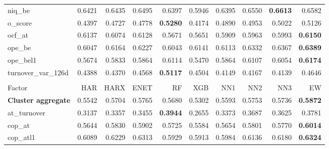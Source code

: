 \begin{longtable}{>{\raggedright\arraybackslash}p{2.6cm}rrrrrrrrr}
niq\_be & 0.6421 & \cellcolor{blue!10}0.6435 & \cellcolor{blue!10}0.6495 & 0.6397 & 0.5946 & 0.6395 & \cellcolor{blue!10}0.6550 & \textbf{\cellcolor{blue!10}0.6613} & \cellcolor{blue!10}0.6582 \\
o\_score & 0.4397 & \cellcolor{blue!10}0.4727 & \cellcolor{blue!10}0.4778 & \textbf{\cellcolor{blue!10}0.5280} & 0.4174 & \cellcolor{blue!10}0.4890 & \cellcolor{blue!10}0.4953 & \cellcolor{blue!10}0.5022 & \cellcolor{blue!10}0.5126 \\
ocf\_at & 0.6137 & 0.6074 & 0.6128 & 0.5671 & 0.5651 & 0.5909 & 0.5963 & 0.5993 & \textbf{\cellcolor{blue!10}0.6150} \\
ope\_be & 0.6047 & \cellcolor{blue!10}0.6164 & \cellcolor{blue!10}0.6227 & 0.6043 & \cellcolor{blue!10}0.6141 & \cellcolor{blue!10}0.6113 & \cellcolor{blue!10}0.6332 & \cellcolor{blue!10}0.6367 & \textbf{\cellcolor{blue!10}0.6389} \\
ope\_bel1 & 0.5674 & \cellcolor{blue!10}0.5833 & \cellcolor{blue!10}0.5864 & \cellcolor{blue!10}0.6114 & 0.5470 & \cellcolor{blue!10}0.5864 & \cellcolor{blue!10}0.6107 & \cellcolor{blue!10}0.6054 & \textbf{\cellcolor{blue!10}0.6174} \\
turnover\_var\_126d & 0.4388 & 0.4370 & \cellcolor{blue!10}0.4568 & \textbf{\cellcolor{blue!10}0.5117} & \cellcolor{blue!10}0.4504 & 0.4149 & 0.4167 & 0.4139 & \cellcolor{blue!10}0.4646 \\
\hline
\multicolumn{10}{@{}l}{\textit{Panel I. Quality}} \\
\hline
Factor & HAR & HARX & ENET & RF & XGB & NN1 & NN2 & NN3 & EW \\
\hline
\textbf{Cluster aggregate} & 0.5542 & \cellcolor{blue!10}0.5704 & \cellcolor{blue!10}0.5765 & \cellcolor{blue!10}0.5680 & 0.5302 & \cellcolor{blue!10}0.5593 & \cellcolor{blue!10}0.5753 & \cellcolor{blue!10}0.5736 & \textbf{\cellcolor{blue!10}0.5872} \\
at\_turnover & 0.3137 & \cellcolor{blue!10}0.3357 & \cellcolor{blue!10}0.3455 & \textbf{\cellcolor{blue!10}0.3944} & 0.2655 & \cellcolor{blue!10}0.3373 & \cellcolor{blue!10}0.3687 & \cellcolor{blue!10}0.3625 & \cellcolor{blue!10}0.3781 \\
cop\_at & 0.5644 & \cellcolor{blue!10}0.5830 & \cellcolor{blue!10}0.5902 & \cellcolor{blue!10}0.5725 & 0.5584 & \cellcolor{blue!10}0.5654 & \cellcolor{blue!10}0.5801 & \cellcolor{blue!10}0.5770 & \textbf{\cellcolor{blue!10}0.6014} \\
cop\_atl1 & 0.6089 & \cellcolor{blue!10}0.6229 & \cellcolor{blue!10}0.6313 & 0.5929 & 0.5913 & 0.5984 & \cellcolor{blue!10}0.6136 & \cellcolor{blue!10}0.6180 & \textbf{\cellcolor{blue!10}0.6324} \\

\end{longtable}
